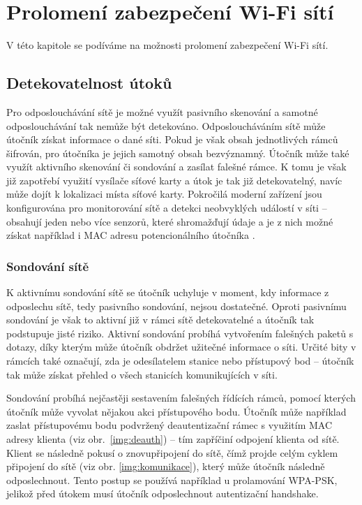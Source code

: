 \chapter{Prolomení zabezpečení Wi-Fi sítí} 
\label{prolomeni}
V této kapitole se podíváme na možnosti prolomení zabezpečení Wi-Fi sítí.

\section{Detekovatelnost útoků}
Pro odposlouchávání sítě je možné využít pasivního skenování a samotné odposlouchávání tak nemůže být detekováno. Odposloucháváním sítě může útočník získat informace o dané síti. Pokud je však obsah jednotlivých rámců šifrován, pro útočníka je jejich samotný obsah bezvýznamný. Útočník může také využít aktivního skenování či sondování a zasílat falešné rámce. K tomu je však již zapotřebí využití vysílače síťové karty a útok je tak již detekovatelný, navíc může dojít k lokalizaci místa síťové karty. Pokročilá moderní zařízení jsou konfigurována pro monitorování sítě a detekci neobvyklých událostí v síti -- obsahují jeden nebo více senzorů, které shromažďují údaje a je z nich možné získat například i MAC adresu potencionálního útočníka \cite{scarfone2012guide}. 

\subsection{Sondování sítě}
K aktivnímu sondování sítě se útočník uchyluje v moment, kdy informace z odposlechu sítě, tedy pasivního sondování, nejsou dostatečné. Oproti pasivnímu sondování je však to aktivní již v rámci sítě detekovatelné a útočník tak podstupuje jisté riziko. Aktivní sondování probíhá vytvořením falešných paketů s dotazy, díky kterým může útočník obdržet užitečné informace o síti. Určité bity v rámcích také označují, zda je odesílatelem stanice nebo přístupový bod -- útočník tak může získat přehled o všech stanicích komunikujících v síti.

Sondování probíhá nejčastěji sestavením falešných řídících rámců, pomocí kterých útočník může vyvolat nějakou akci přístupového bodu. Útočník může například zaslat přístupovému bodu podvržený deautentizační rámec s využitím MAC adresy klienta (viz obr.~\ref{img:deauth}) -- tím zapříčiní odpojení klienta od sítě. Klient se následně pokusí o znovupřipojení do sítě, čímž projde celým cyklem připojení do sítě (viz obr. \ref{img:komunikace}), který může útočník následně odposlechnout. Tento postup se používá například u prolamování WPA-PSK, jelikož před útokem musí útočník odposlechnout autentizační handshake. 

